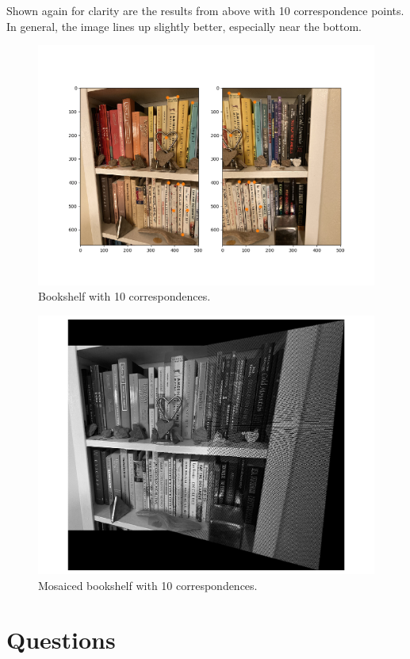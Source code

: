 \documentclass[]{article}
\begin{document}
	\newpage
	
	Shown again for clarity are the results from above with 10 correspondence points. In general, the image lines up slightly better, especially near the bottom.
	\begin{figure}[H]
		\centering
		\includegraphics[width=6.5in]{test_images/shelf_10_correspondences.png}
		\caption{Bookshelf with 10 correspondences. }
	\end{figure}
	
	\begin{figure}[H]
		\centering
		\includegraphics[width=6.5in]{test_images/shelf_10_floor.png}
		\caption{Mosaiced bookshelf with 10 correspondences. }
	\end{figure}
\section{Questions}
\end{document}

